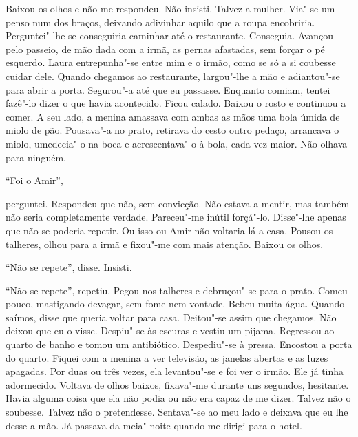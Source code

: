 Baixou os olhos e não me respondeu. Não insisti. Talvez a mulher.
Via"-se um penso num dos braços, deixando adivinhar aquilo que a roupa
encobriria. Perguntei"-lhe se conseguiria caminhar até o restaurante.
Conseguia. Avançou pelo passeio, de mão dada com a irmã, as pernas
afastadas, sem forçar o pé esquerdo. Laura entrepunha"-se entre mim e o
irmão, como se só a si coubesse cuidar dele. Quando chegamos ao
restaurante, largou"-lhe a mão e adiantou"-se para abrir a porta.
Segurou"-a até que eu passasse. Enquanto comiam, tentei fazê"-lo dizer o
que havia acontecido. Ficou calado. Baixou o rosto e continuou a comer.
A seu lado, a menina amassava com ambas as mãos uma bola úmida de miolo
de pão. Pousava"-a no prato, retirava do cesto outro pedaço, arrancava o
miolo, umedecia"-o na boca e acrescentava"-o à bola, cada vez maior.
Não olhava para ninguém.

``Foi o Amir'',

perguntei. Respondeu que não, sem convicção. Não estava a mentir, mas
também não seria completamente verdade. Pareceu"-me inútil forçá"-lo.
Disse"-lhe apenas que não se poderia repetir. Ou isso ou Amir não
voltaria lá a casa. Pousou os talheres, olhou para a irmã e fixou"-me
com mais atenção. Baixou os olhos.

``Não se repete'',
disse. Insisti.

``Não se repete'',
repetiu. Pegou nos talheres e debruçou"-se para o prato. Comeu pouco,
mastigando devagar, sem fome nem vontade. Bebeu muita água. Quando
saímos, disse que queria voltar para casa. Deitou"-se assim que
chegamos. Não deixou que eu o visse. Despiu"-se às escuras e vestiu um
pijama. Regressou ao quarto de banho e tomou um antibiótico.
Despediu"-se à pressa. Encostou a porta do quarto. Fiquei com a menina a
ver televisão, as janelas abertas e as luzes apagadas. Por duas ou três
vezes, ela levantou"-se e foi ver o irmão. Ele já tinha adormecido.
Voltava de olhos baixos, fixava"-me durante uns segundos, hesitante.
Havia alguma coisa que ela não podia ou não era capaz de me dizer.
Talvez não o soubesse. Talvez não o pretendesse. Sentava"-se ao meu lado
e deixava que eu lhe desse a mão. Já passava da meia"-noite quando me
dirigi para o hotel.

